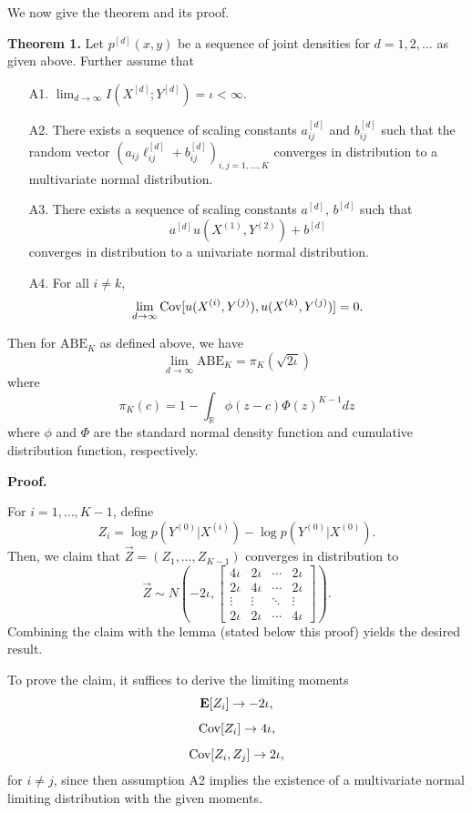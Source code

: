 \documentclass[12pt]{article}
\begin{document}
We now give the theorem and its proof.

\textbf{Theorem 1.} Let $p^{[d]}(x, y)$ be a sequence of joint densities
for $d = 1,2,\hdots$ as given above.  Further assume that
\begin{itemize}
\item[A1.] $\lim_{d \to \infty} I(X^{[d]}; Y^{[d]}) = \iota < \infty.$
\item[A2.] There exists a sequence of scaling constants $a_{ij}^{[d]}$
and $b_{ij}^{[d]}$ such that the random vector $(a_{ij}\ell_{ij}^{[d]} +
b_{ij}^{[d]})_{i, j = 1,\hdots, K}$ converges in distribution to a
multivariate normal distribution.
\item[A3.] There exists a sequence of scaling constants $a^{[d]}$, $b^{[d]}$ such that
\[
a^{[d]}u(X^{(1)}, Y^{(2)}) + b^{[d]}
\]
converges in distribution to a univariate normal distribution.
\item[A4.] For all $i \neq k$,
\[\lim_{d \to \infty}\text{Cov}[u(X^{(i)}, Y^{(j)}), u(X^{(k)}, Y^{(j)})] = 0.\]
\end{itemize}
Then for $\text{ABE}_K$ as defined above, we have
\[
\lim_{d \to \infty} \text{ABE}_{K} = \pi_K(\sqrt{2 \iota})
\]
where
\[
\pi_K(c) = 1 - \int_{\mathbb{R}} \phi(z - c)  \Phi(z)^{K-1} dz
\]
where $\phi$ and $\Phi$ are the standard normal density function and
cumulative distribution function, respectively.

\textbf{Proof.}

For $i = 1,\hdots, K-1$, define
\[
Z_i = \log p(Y^{(0)}|X^{(i)}) - \log p(Y^{(0)}|X^{(0)}).
\]
Then, we claim that $\vec{Z} = (Z_1,\hdots, Z_{K-1})$ converges in distribution to
\[
\vec{Z} \sim N\left(-2\iota, 
\begin{bmatrix}
4\iota & 2\iota & \cdots & 2\iota\\
2\iota & 4\iota & \cdots & 2\iota\\
\vdots & \vdots & \ddots & \vdots\\
2\iota & 2\iota & \cdots & 4\iota
\end{bmatrix}
\right).
\]
Combining the claim with the lemma (stated below this proof) yields the
desired result.

To prove the claim, it suffices to derive the limiting moments
\[\textbf{E}[Z_i] \to -2\iota,\]
\[\text{Cov}[Z_i] \to 4\iota,\]
\[\text{Cov}[Z_i, Z_j] \to 2\iota,\]
for $i \neq j$,
since then assumption A2 implies the existence of a multivariate normal
limiting distribution with the given moments.
\end{document}
